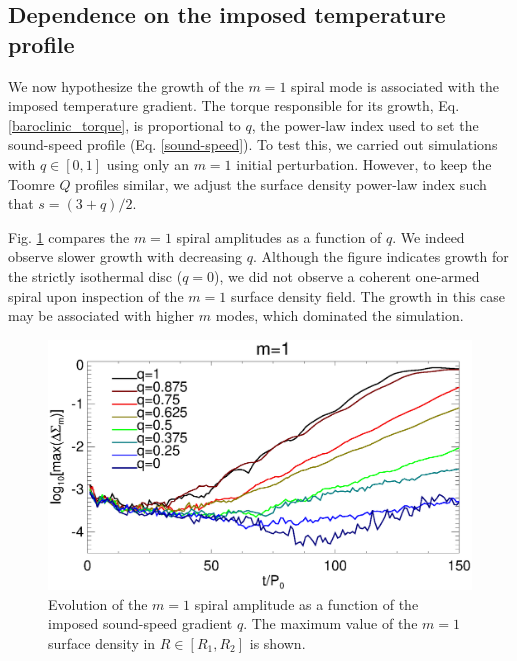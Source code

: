 
\subsection{Dependence on the imposed temperature profile} 
We now hypothesize the growth of the $m=1$ spiral mode is
associated with the imposed temperature gradient. The torque
responsible for its growth, Eq. \ref{baroclinic_torque}, is
proportional to $q$, the power-law index used to set the sound-speed
profile (Eq. \ref{sound-speed}). To test this, we carried out
simulations with $q\in[0,1]$ using only an $m=1$ initial 
perturbation. However, to keep the Toomre $Q$ profiles similar, we adjust
the surface density power-law index such that $s = (3+q)/2$. 

Fig. \ref{fargo_varq} compares the $m=1$ spiral amplitudes as a
function of $q$. We indeed observe slower growth with decreasing
$q$. Although the figure indicates growth for the strictly isothermal
disc ($q=0$), we did not observe a coherent one-armed spiral upon
inspection of the $m=1$ surface density field. The growth in this case
may be associated with higher $m$ modes, which dominated the
simulation.    

\begin{figure}
  \includegraphics[width=\linewidth]{figures/m1_analysis_plot_fargo_varq.ps}   
  \caption{Evolution of the $m=1$ spiral amplitude as a function of
    the imposed sound-speed gradient $q$. The maximum value of the
    $m=1$ surface density in $R\in[R_1,R_2]$ is shown. 
    \label{fargo_varq}} 
\end{figure}

